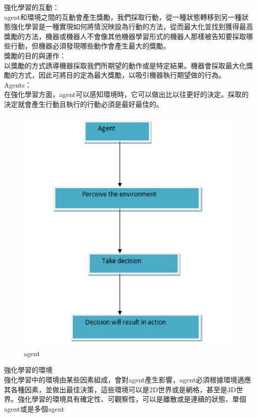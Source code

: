 \documentclass[14pt,a4paper]{report}  %
\begin{document}
\fi
強化學習的互動：\\[1pt]
 agent和環境之間的互動會產生獎勵，我們採取行動，從一種狀態轉移到另一種狀態強化學習是一種實現如何將情況映設為行動的方法，從而最大化並找到獲得最高獎勵的方法，機器或機器人不會像其他機器學習形式的機器人那樣被告知要採取哪些行動，但機器必須發現哪些動作會產生最大的獎勵。\\[1pt]
獎勵的目的與運作：\\
 以獎勵的方式誘導機器採取我們所期望的動作或是特定結果。機器會採取最大化獎勵的方式，因此可將目的定為最大獎勵，以吸引機器執行期望做的行為。\\[6pt]
Agents：\\[6pt]
 在強化學習方面，agent可以感知環境時，它可以做出比以往更好的決定。採取的決定就會產生行動且執行的行動必須是最好最佳的。\\[12pt]
\begin{figure}[hbt!]
\begin{center}
\includegraphics[scale=0.74]{agent}
\caption{\Large agent}
\label{agent}
\end{center}
\end{figure}
強化學習的環境\\
\qquad 強化學習中的環境由某些因素組成，會對agent產生影響，agent必須根據環境適應其各種因素，並做出最佳決策，這些環境可以是2D世界或是網格，甚至是3D世界。強化學習的環境具有確定性、可觀察性，可以是離散或是連續的狀態、單個agent或是多個agent\\
\end{document}
